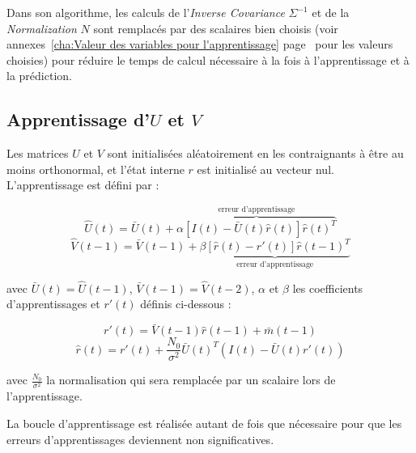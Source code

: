 Dans son algorithme, les calculs de l'\textit{Inverse Covariance} $\Sigma^{-1}$
et de la \textit{Normalization} $N$ sont remplacés par des scalaires bien
choisis (voir annexes~\ref{cha:Valeur des variables pour l'apprentissage}
page~\pageref{cha:Valeur des variables pour l'apprentissage} pour les valeurs
choisies) pour réduire le temps de calcul nécessaire à la fois à
l'apprentissage et à la prédiction.


\subsection{Apprentissage d'$U$ et $V$} %
\label{sub:Apprentissage de U et V}

Les matrices $U$ et $V$ sont initialisées aléatoirement en les contraignants
à être au moins orthonormal, et l'état interne $r$ est initialisé au vecteur
nul. L'apprentissage est défini par :

\begin{equation}
   \label{eqn:learning_U}
   \hat{U}(t) = \bar{U}(t) + \overbrace{\alpha[I(t) - \bar{U}(t)\hat{r}(t)]\hat{r}(t)^T}^\text{erreur d'apprentissage}
\end{equation}
\begin{equation}
   \label{eqn:learning_V}
   \hat{V}(t-1) = \bar{V}(t-1) + \underbrace{\beta[\hat{r}(t) - r'(t)]\hat{r}(t-1)^T}_\text{erreur d'apprentissage}
\end{equation}

avec $\bar{U}(t) = \hat{U}(t-1)$, $\bar{V}(t-1) = \hat{V}(t-2)$, $\alpha$ et
$\beta$ les coefficients d'apprentissages et $r'(t)$ définis ci-dessous :

\begin{equation}
   \label{eqn:def_r_prime}
   r'(t) =  \bar{V}(t-1)\hat{r}(t-1) + \bar{m}(t-1)
\end{equation}
\begin{equation}
   \label{eqn:def_r_hat}
   \hat{r}(t) = r'(t) + \frac{N_0}{\sigma^2}\bar{U}(t)^T(I(t)-\bar{U}(t)r'(t))
\end{equation}

avec $\frac{N_0}{\sigma^2}$ la normalisation qui sera remplacée par un scalaire lors
de l'apprentissage.

La boucle d'apprentissage est réalisée autant de fois que nécessaire pour que
les erreurs d'apprentissages deviennent non significatives.


